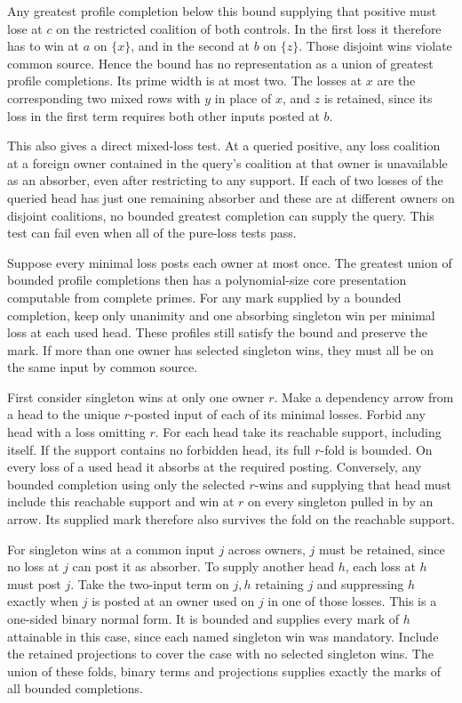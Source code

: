 Any greatest profile completion below this bound supplying
that positive must lose at $c$ on the restricted coalition
of both controls. In the first loss it therefore has to
win at $a$ on $\{x\}$, and in the second at $b$ on $\{z\}$.
Those disjoint wins violate common source. Hence the bound
has no representation as a union of greatest profile
completions. Its prime width is at most two. The losses at
$x$ are the corresponding two mixed rows with $y$ in place
of $x$, and $z$ is retained, since its loss in the first
term requires both other inputs posted at $b$.

This also gives a direct mixed-loss test. At a queried
positive, any loss coalition at a foreign owner contained
in the query's coalition at that owner is unavailable as
an absorber, even after restricting to any support.
If each of two losses of the queried head has just one
remaining absorber and these are at different owners
on disjoint coalitions, no bounded greatest completion
can supply the query. This test can fail even when all
of the pure-loss tests pass.

Suppose every minimal loss posts each owner at most once.
The greatest union of bounded profile completions then
has a polynomial-size core presentation computable from
complete primes. For any mark supplied by a bounded
completion, keep only unanimity and one absorbing
singleton win per minimal loss at each used head.
These profiles still satisfy the bound and preserve
the mark. If more than one owner has selected
singleton wins, they must all be on the same input
by common source.

First consider singleton wins at only one owner $r$.
Make a dependency arrow from a head to the unique
$r$-posted input of each of its minimal losses.
Forbid any head with a loss omitting $r$. For each
head take its reachable support, including itself.
If the support contains no forbidden head, its
full $r$-fold is bounded. On every loss of a used
head it absorbs at the required posting. Conversely,
any bounded completion using only the selected
$r$-wins and supplying that head must include this
reachable support and win at $r$ on every singleton
pulled in by an arrow. Its supplied mark therefore
also survives the fold on the reachable support.

For singleton wins at a common input $j$ across
owners, $j$ must be retained, since no loss at $j$
can post it as absorber. To supply another head
$h$, each loss at $h$ must post $j$. Take the
two-input term on $j,h$ retaining $j$ and suppressing
$h$ exactly when $j$ is posted at an owner used on
$j$ in one of those losses. This is a one-sided
binary normal form. It is bounded and supplies
every mark of $h$ attainable in this case, since
each named singleton win was mandatory. Include
the retained projections to cover the case with
no selected singleton wins. The union of these
folds, binary terms and projections supplies
exactly the marks of all bounded completions.

